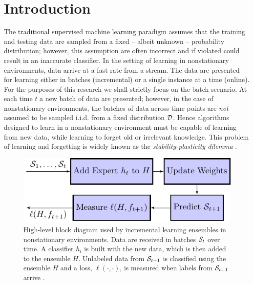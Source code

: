 \documentclass[10pt, conference]{IEEEtran}
\begin{document}
\section{Introduction}
\label{sec:mot}

The traditional supervised machine learning paradigm assumes that the training and testing data are sampled from a fixed -- albeit unknown -- probability distribution; however, this assumption are often incorrect and if violated could result in an inaccurate classifier. 
In the setting of learning in nonstationary environments,  data arrive at a fast rate from a stream. The data  are presented for learning  either in batches (incremental) or a single instance at a time (online). 
For the purposes of this research we shall strictly focus on the batch scenario. At each time $t$ a new batch of data are presented; however, in the case of nonstationary environments, the batches of data across  time points are {\em not} assumed to be sampled i.i.d. from a fixed distribution ${\mathcal D}$. 
Hence algorithms designed to learn in a nonstationary environment must be capable of learning from new data, while learning to forget old or irrelevant knowledge. This problem of learning and forgetting is widely known as the {\em stability-plasticity dilemma} \cite{Grossberg1988NN}. 


\begin{figure}
\centering
\includegraphics[width=.5\textwidth]{survey-f1.pdf}
\caption{High-level block diagram used by incremental learning ensembles in nonstationary environments. Data are received in batches ${\mathcal S}_t$ over time. A classifier $h_t$ is built with the new data, which is then added to the ensemble $H$. Unlabeled data from ${\mathcal S}_{t+1}$ is classified using the ensemble $H$ and a loss, $\ell(\cdot,\cdot)$, is measured when labels from ${\mathcal S}_{t+1}$ arrive \cite{Ditzler2015CIM}. }
\label{fig:learning}
\end{figure}
\end{document}
